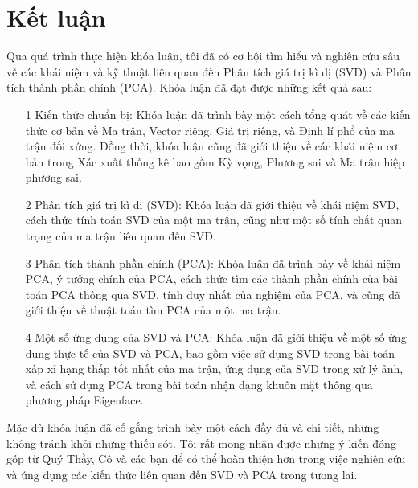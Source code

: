 \documentclass[14pt,oneside,a4paper]{report}
\numberwithin{equation}{section}
\begin{document}
\chapter*{Kết luận}
Qua quá trình thực hiện khóa luận, tôi đã có cơ hội tìm hiểu và nghiên cứu sâu về các khái niệm và kỹ thuật liên quan đến Phân tích giá trị kì dị (SVD) và Phân tích thành phần chính (PCA). Khóa luận đã đạt được những kết quả sau:
\begin{itemize}
\item[1] Kiến thức chuẩn bị: Khóa luận đã trình bày một cách tổng quát về các kiến thức cơ bản về Ma trận, Vector riêng, Giá trị riêng, và Định lí phổ của ma trận đối xứng. Đồng thời, khóa luận cũng đã giới thiệu về các khái niệm cơ bản trong Xác xuất thống kê bao gồm Kỳ vọng, Phương sai và Ma trận hiệp phương sai.

\item[2] Phân tích giá trị kì dị (SVD): Khóa luận đã giới thiệu về khái niệm SVD, cách thức tính toán SVD của một ma trận, cũng như một số tính chất quan trọng của ma trận liên quan đến SVD.

\item[3] Phân tích thành phần chính (PCA): Khóa luận đã trình bày về khái niệm PCA, ý tưởng chính của PCA, cách thức tìm các thành phần chính của bài toán PCA thông qua SVD, tính duy nhất của nghiệm của PCA, và cũng đã giới thiệu về thuật toán tìm PCA của một ma trận.

\item[4] Một số ứng dụng của SVD và PCA: Khóa luận đã giới thiệu về một số ứng dụng thực tế của SVD và PCA, bao gồm việc sử dụng SVD trong bài toán xấp xỉ hạng thấp tốt nhất của ma trận, ứng dụng của SVD trong xử lý ảnh, và cách sử dụng PCA trong bài toán nhận dạng khuôn mặt thông qua phương pháp Eigenface.
\end{itemize}
Mặc dù khóa luận đã cố gắng trình bày một cách đầy đủ và chi tiết, nhưng không tránh khỏi những thiếu sót. Tôi rất mong nhận được những ý kiến đóng góp từ Quý Thầy, Cô và các bạn để có thể hoàn thiện hơn trong việc nghiên cứu và ứng dụng các kiến thức liên quan đến SVD và PCA trong tương lai.
\end{document}
